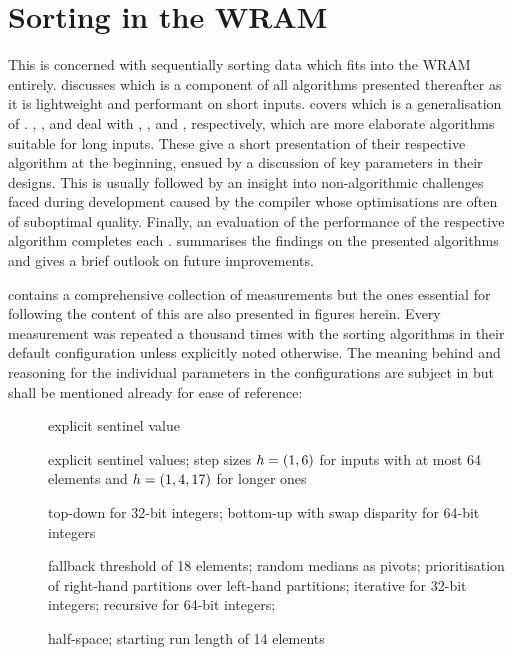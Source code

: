 \chapter[Sorting in the \texorpdfstring{\abb{WRAM}}{WRAM}]{Sorting in the \acs*{WRAM}}
\label{sec:tasklet}

This  is concerned with sequentially sorting data which fits into the \ac{WRAM} entirely.
 discusses \IS{} which is a component of all algorithms presented thereafter as it is lightweight and performant on short inputs.
 covers \ShS{} which is a generalisation of \IS{}.
\hyperref[sec:tasklet:heap]{ }, , and  deal with \HS{}, \QS{}, and \MS{}, respectively, which are more elaborate algorithms suitable for long inputs.
These  give a short presentation of their respective algorithm at the beginning, ensued by a discussion of key parameters in their designs.
This is usually followed by an insight into non-algorithmic challenges faced during development caused by the compiler whose optimisations are often of suboptimal quality.
Finally, an evaluation of the performance of the respective algorithm completes each .
 summarises the findings on the presented algorithms and gives a brief outlook on future improvements.

 contains a comprehensive collection of measurements but the ones essential for following the content of this  are also presented in figures herein.
Every measurement was repeated a thousand times with the sorting algorithms in their default configuration unless explicitly noted otherwise.
The meaning behind and reasoning for the individual parameters in the configurations are subject in  but shall be mentioned already for ease of reference:
\begin{description}
	\item[\IS{}]
	explicit sentinel value

	\item[\ShS{}]
	explicit sentinel values;
	step sizes \(h = \lparen1, 6\rparen\) for inputs with at most 64 elements and \(h = \lparen1, 4, 17\rparen\) for longer ones

	\item[\HS{}]
	top-down for 32-bit integers;
	bottom-up with swap disparity for 64-bit integers

	\item[\QS{}]
	fallback threshold of 18 elements;
	random medians as pivots;
	prioritisation of right-hand partitions over left-hand partitions;
	iterative for 32-bit integers;
	recursive for 64-bit integers;

	\item[\MS{}]
	half-space;
	starting run length of 14 elements
\end{description}

